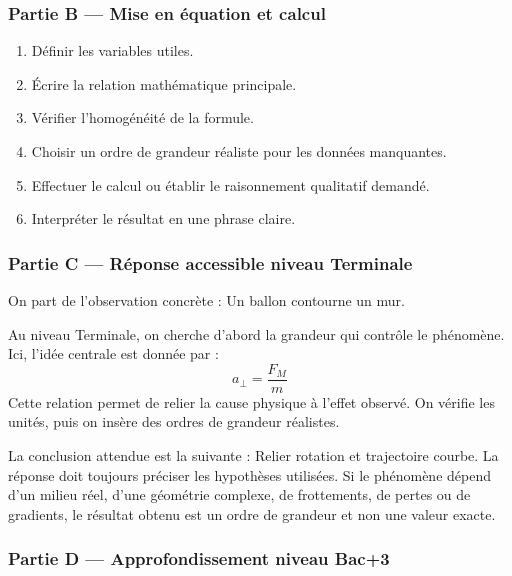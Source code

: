 \documentclass[11pt,a4paper]{article}
\begin{document}
\subsubsection*{Partie B — Mise en équation et calcul}

\begin{enumerate}
  \item Définir les variables utiles.
  \item Écrire la relation mathématique principale.
  \item Vérifier l'homogénéité de la formule.
  \item Choisir un ordre de grandeur réaliste pour les données manquantes.
  \item Effectuer le calcul ou établir le raisonnement qualitatif demandé.
  \item Interpréter le résultat en une phrase claire.
\end{enumerate}

\subsubsection*{Partie C — Réponse accessible niveau Terminale}

\begin{corrigebox}
On part de l'observation concrète : Un ballon contourne un mur.

Au niveau Terminale, on cherche d'abord la grandeur qui contrôle le phénomène. Ici, l'idée centrale est donnée par :
\[
a_\perp=\frac{F_M}{m}
\]
Cette relation permet de relier la cause physique à l'effet observé. On vérifie les unités, puis on insère des ordres de grandeur réalistes.

La conclusion attendue est la suivante : Relier rotation et trajectoire courbe. La réponse doit toujours préciser les hypothèses utilisées. Si le phénomène dépend d'un milieu réel, d'une géométrie complexe, de frottements, de pertes ou de gradients, le résultat obtenu est un ordre de grandeur et non une valeur exacte.
\end{corrigebox}

\subsubsection*{Partie D — Approfondissement niveau Bac+3}
\end{document}
